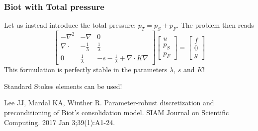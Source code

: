 \begin{frame}
\frametitle{Biot with \alert{Total} pressure}
Let us instead introduce 
the \alert{total pressure:} $p_T=p_S + p_F$. 
The problem then reads
\[
\left[
\begin{array}{ccc}
-\nabla^2 & -\nabla & 0 \\
\nabla\cdot & -\frac{1}{\lambda} & \frac{1}{\lambda}  \\ 
0 & \frac{1}{\lambda} &  -s - \frac{1}{\lambda} + \nabla\cdot K \nabla   
\end{array}
\right]
\left[
\begin{array}{c} u \\ p_S \\ p_F \end{array} 
\right]
= 
\left[
\begin{array}{c} f \\ 0 \\ g \end{array} 
\right]
\]
This formulation is perfectly stable in the parameters $\lambda$, $s$ and $K$! 

\vspace{0.3cm}
Standard Stokes elements can be used!

\vspace{0.3cm}
\footnotesize{
Lee JJ, Mardal KA, Winther R. Parameter-robust discretization and preconditioning of Biot's consolidation model. SIAM Journal on Scientific Computing. 2017 Jan 3;39(1):A1-24.
}
\end{frame}
